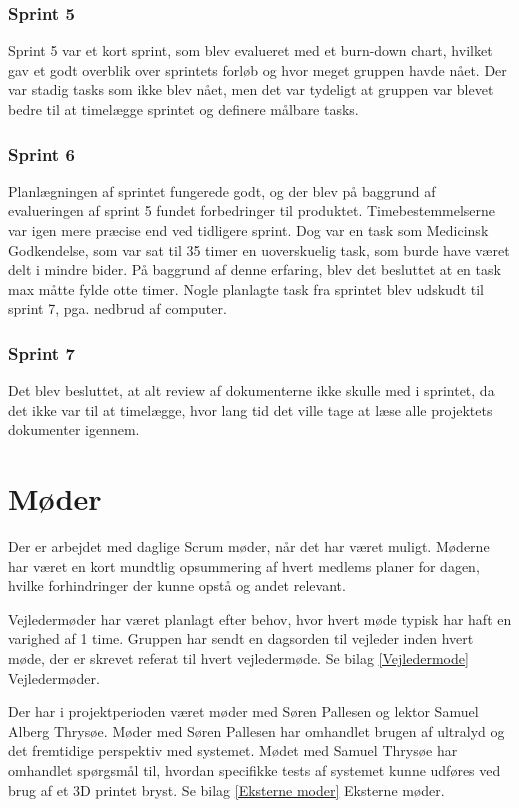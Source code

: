 \subsubsection{Sprint 5} 
Sprint 5 var et kort sprint, som blev evalueret med et burn-down chart, hvilket gav et godt overblik over sprintets forløb og hvor meget gruppen havde nået. Der var stadig tasks som ikke blev nået, men det var tydeligt at gruppen var blevet bedre til at timelægge sprintet og definere målbare tasks.

\subsubsection{Sprint 6} 
Planlægningen af sprintet fungerede godt, og der blev på baggrund af evalueringen af sprint 5 fundet forbedringer til produktet. Timebestemmelserne var igen mere præcise end ved tidligere sprint. Dog var en task som Medicinsk Godkendelse, som var sat til 35 timer en uoverskuelig task, som burde have været delt i mindre bider. På baggrund af denne erfaring, blev det besluttet at en task max måtte fylde otte timer. Nogle planlagte task fra sprintet blev udskudt til sprint 7, pga. nedbrud af computer.   

\subsubsection{Sprint 7} 
Det blev besluttet, at alt review af dokumenterne ikke skulle med i sprintet, da det ikke var til at timelægge, hvor lang tid det ville tage at læse alle projektets dokumenter igennem. 
 
\section{Møder}
Der er arbejdet med daglige Scrum møder, når det har været muligt. Møderne har været en kort mundtlig opsummering af hvert medlems planer for dagen, hvilke forhindringer der kunne opstå og andet relevant. 

Vejledermøder har været planlagt efter behov, hvor hvert møde typisk har haft en varighed af 1 time. Gruppen har sendt en dagsorden til vejleder inden hvert møde, der er skrevet referat til hvert vejledermøde. Se bilag \ref{Vejledermode} Vejledermøder.
 
Der har i projektperioden været møder med Søren Pallesen og lektor Samuel Alberg Thrysøe. Møder med Søren Pallesen har omhandlet brugen af ultralyd og det fremtidige perspektiv med systemet. Mødet med Samuel Thrysøe har omhandlet spørgsmål til, hvordan specifikke tests af systemet kunne udføres ved brug af et 3D printet bryst. Se bilag \ref{Eksterne moder} Eksterne møder. 

